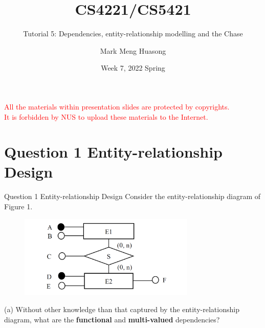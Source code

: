 \title{CS4221/CS5421}
\newcommand {\mvd}{\mbox{$\; \rightarrow \! \! \! \! \rightarrow \; $}}

\subtitle{Tutorial 5: Dependencies, entity-relationship modelling and the Chase}

\author{Mark Meng Huasong}



\date{Week 7, 2022 Spring}

\begin{frame}
	\titlepage
	\begin{tcolorbox}
		\begin{center}
			{\scriptsize \textcolor{red}{All the materials within presentation slides are protected by copyrights.\\
					It is forbidden by NUS to upload these materials to the Internet.}}
		\end{center}
	\end{tcolorbox}
\end{frame}

\section*{Question 1 Entity-relationship Design}

\begin{frame}[fragile]{Question 1 Entity-relationship Design}
Consider the entity-relationship diagram of Figure 1.
\begin{figure}
	\includegraphics[width=0.75\textwidth, trim=0 0 0 0, clip]{4221-t5/images/q1.png}
\end{figure}
(a) Without other knowledge than that captured by the entity-relationship diagram, what are the \textbf{functional} and \textbf{multi-valued} dependencies?
\end{frame}

